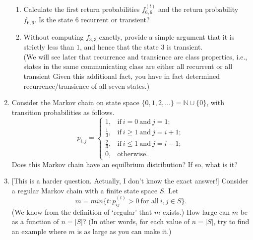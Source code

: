\documentclass[11pt,a4paper]{report}
\begin{document}
\begin{enumerate}
\begin{enumerate}
            \item  Calculate the first return probabilities $f^{(t)}_{6,6}$ and the return probability $f_{6,6}$. Is the state $6$ recurrent or transient?
            \item Without computing $f_{3,3}$ exactly, provide a simple argument that it is strictly less than $1$, and hence that the state $3$ is transient.\\
            (We will see later that recurrence and transience are class properties, i.e., states in the same communicating class are either all recurrent or all transient Given this additional fact, you have in fact determined recurrence/transience of all seven states.)
        \end{enumerate}
        \item Consider the Markov chain on state space $\{0, 1, 2, \ldots \} = \mathbb{N} \cup \{0\}$, with transition probabilities as follows.
        $$
        p_{i,j}
        =
        \begin{cases}
            1, & \text{if}\ i = 0\ \text{and}\ j =1;\\
            \frac{1}{3}, & \text{if}\ i \geq 1\ \text{and}\ j = i+1;\\
            \frac{2}{3}, & \text{if}\ i \leq 1\ \text{and}\ j = i-1;\\
            0, & \text{otherwise.}
        \end{cases}
        $$
        Does this Markov chain have an equilbrium distribution? If so, what is it?
        \item {[}This is a harder question. Actually, I don’t know the exact answer!{]} Consider a regular Markov chain with a finite state space $S$. Let
        $$m = min \{ t : p^{(t)}_{ij} > 0\ \text{for all}\ i, j \in S \}.$$
        (We know from the definition of ‘regular’ that $m$ exists.) How large can $m$ be as a function of $n = |S|$? (In other words, for each value of $n = |S|$, try to find an example where $m$ is as large as you can make it.)
    \end{enumerate}
\end{document}
